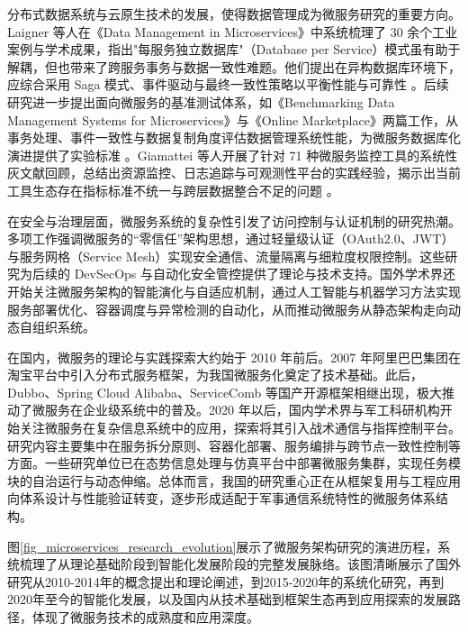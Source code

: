 分布式数据系统与云原生技术的发展，使得数据管理成为微服务研究的重要方向。Laigner 等人在《Data Management in Microservices》中系统梳理了 30 余个工业案例与学术成果，指出"每服务独立数据库"（Database per Service）模式虽有助于解耦，但也带来了跨服务事务与数据一致性难题。他们提出在异构数据库环境下，应综合采用 Saga 模式、事件驱动与最终一致性策略以平衡性能与可靠性 \cite{Laigner2021Data}。后续研究进一步提出面向微服务的基准测试体系，如《Benchmarking Data Management Systems for Microservices》与《Online Marketplace》两篇工作，从事务处理、事件一致性与数据复制角度评估数据管理系统性能，为微服务数据库化演进提供了实验标准 \cite{BenchmarkingDataMgmt2024,OnlineMarketplace2024}。Giamattei 等人开展了针对 71 种微服务监控工具的系统性灰文献回顾，总结出资源监控、日志追踪与可观测性平台的实践经验，揭示出当前工具生态存在指标标准不统一与跨层数据整合不足的问题 \cite{MonitoringTools2024}。

在安全与治理层面，微服务系统的复杂性引发了访问控制与认证机制的研究热潮。多项工作强调微服务的“零信任”架构思想，通过轻量级认证（OAuth2.0、JWT）与服务网格（Service Mesh）实现安全通信、流量隔离与细粒度权限控制。这些研究为后续的 DevSecOps 与自动化安全管控提供了理论与技术支持。国外学术界还开始关注微服务架构的智能演化与自适应机制，通过人工智能与机器学习方法实现服务部署优化、容器调度与异常检测的自动化，从而推动微服务从静态架构走向动态自组织系统。

在国内，微服务的理论与实践探索大约始于 2010 年前后。2007 年阿里巴巴集团在淘宝平台中引入分布式服务框架，为我国微服务化奠定了技术基础。此后，Dubbo、Spring Cloud Alibaba、ServiceComb 等国产开源框架相继出现，极大推动了微服务在企业级系统中的普及。2020 年以后，国内学术界与军工科研机构开始关注微服务在复杂信息系统中的应用，探索将其引入战术通信与指挥控制平台。研究内容主要集中在服务拆分原则、容器化部署、服务编排与跨节点一致性控制等方面。一些研究单位已在态势信息处理与仿真平台中部署微服务集群，实现任务模块的自治运行与动态伸缩。总体而言，我国的研究重心正在从框架复用与工程应用向体系设计与性能验证转变，逐步形成适配于军事通信系统特性的微服务体系结构。

图\ref{fig_microservices_research_evolution}展示了微服务架构研究的演进历程，系统梳理了从理论基础阶段到智能化发展阶段的完整发展脉络。该图清晰展示了国外研究从2010-2014年的概念提出和理论阐述，到2015-2020年的系统化研究，再到2020年至今的智能化发展，以及国内从技术基础到框架生态再到应用探索的发展路径，体现了微服务技术的成熟度和应用深度。

